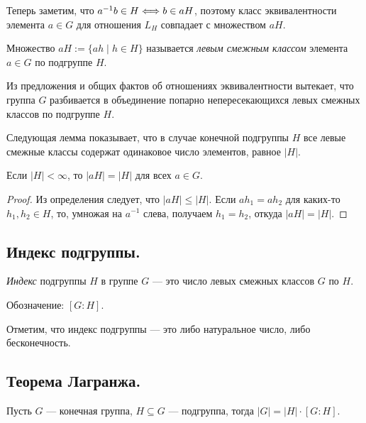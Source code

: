 Теперь заметим, что $a^{-1}b \in H \Longleftrightarrow b \in aH$,
поэтому класс эквивалентности элемента $a \in G$ для отношения
$L_H$ совпадает с множеством $aH$.
\vspace{0.4cm}
\begin{definition}
  \hspace{-0.5cm}
  Множество $aH := \{ah \mid h \in H\}$ называется
  \textit{левым смежным классом} элемента $a \in G$ 
  по подгруппе $H$.
\end{definition}

Из предложения и общих фактов об отношениях эквивалентности вытекает,
что группа $G$ разбивается в объединение попарно непересекающихся левых
смежных классов по подгруппе $H$.

Следующая лемма показывает, что в случае конечной подгруппы $H$
все левые смежные классы содержат одинаковое число элементов, равное $|H|$.

\begin{lemma}\label{le:first}
  Если $|H| < \infty$, то $|aH| = |H|$ для всех $a \in G$.
\end{lemma}

\begin{proof}
  Из определения следует, что $|aH| \leqslant |H|$.
  Если $ah_1 = ah_2$ для каких-то $h_1, h_2 \in H$, то,
  умножая на $a^{-1}$ слева, получаем $h_1 = h_2$, откуда $|aH| = |H|$.  
\end{proof}


\subsection{Индекс подгруппы.}
\vspace{0.5cm}
\begin{definition}
  \textit{Индекс} подгруппы $H$ в группе $G$ ---
  это число левых смежных классов $G$ по $H$.
\end{definition}

Обозначение: $[G : H]$.

Отметим, что индекс подгруппы ---
это либо натуральное число, либо бесконечность.

\newpage
\subsection{Теорема Лагранжа.}
\vspace{0.2cm}
\begin{theorem}
  Пусть $G$ --- конечная группа, $H \subseteq G$ --- подгруппа,
  тогда $|G| = |H| \cdot [G : H]$.  
\end{theorem}


